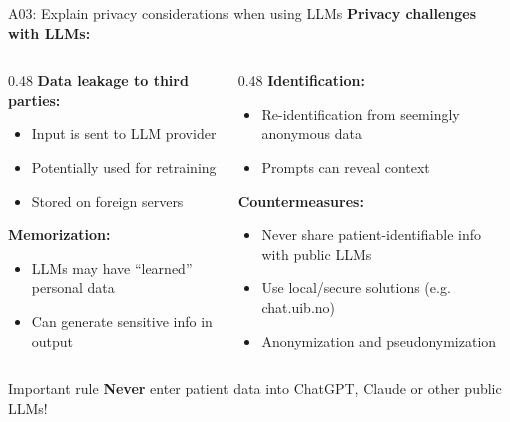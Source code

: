\documentclass[aspectratio=169, 10pt]{beamer}
\begin{document}
\begin{frame}{A03: Explain privacy considerations when using LLMs}
    \textbf{Privacy challenges with LLMs:}
    
    \vspace{0.3cm}
    \begin{columns}[T]
        \begin{column}{0.48\textwidth}
            \textbf{Data leakage to third parties:}
            \begin{itemize}
                \item Input is sent to LLM provider
                \item Potentially used for retraining
                \item Stored on foreign servers
            \end{itemize}
            
            \vspace{0.3cm}
            \textbf{Memorization:}
            \begin{itemize}
                \item LLMs may have ``learned'' personal data
                \item Can generate sensitive info in output
            \end{itemize}
        \end{column}
        \begin{column}{0.48\textwidth}
            \textbf{Identification:}
            \begin{itemize}
                \item Re-identification from seemingly anonymous data
                \item Prompts can reveal context
            \end{itemize}
            
            \vspace{0.3cm}
            \textbf{Countermeasures:}
            \begin{itemize}
                \item Never share patient-identifiable info with public LLMs
                \item Use local/secure solutions (e.g. chat.uib.no)
                \item Anonymization and pseudonymization
            \end{itemize}
        \end{column}
    \end{columns}
    
    \vspace{0.3cm}
    \begin{alertblock}{Important rule}
        \textbf{Never} enter patient data into ChatGPT, Claude or other public LLMs!
    \end{alertblock}
\end{frame}
\end{document}
